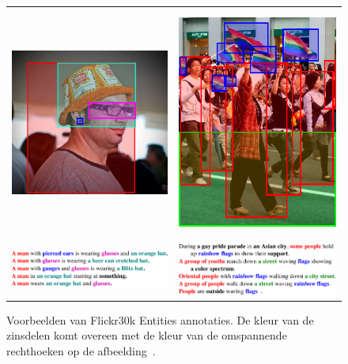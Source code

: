 \begin{figure}[!tb]
    \centering
    \begin{tabular}[t]{cc}
      \includegraphics[height=3.0in]{Images/example_hat.png} \vspace{-3mm}&
      \includegraphics[height=3.0in]{Images/example_parade.png}\\
      \includegraphics[valign = T,width=.4\columnwidth]{Images/example_hat_text.pdf}&
      \includegraphics[valign = T,width=.4\columnwidth]{Images/example_parade_text.pdf}
  \end{tabular}
\caption[Voorbeelden van Flickr30k Entities annotaties]{Voorbeelden van Flickr30k Entities annotaties. De kleur van de zinsdelen komt overeen met de kleur van de omspannende rechthoeken op de afbeelding~\cite{Plummer2015}.}
\label{fig:entities}
\end{figure}

